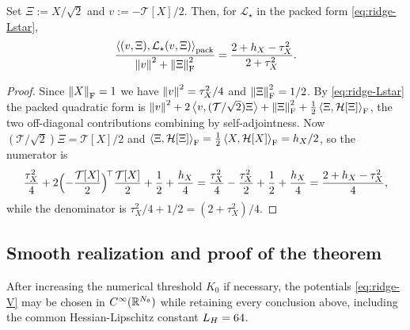 \begin{lemma}
\label{lem:ridge-Rayleigh}
Set $\Xi:=X/\sqrt2$ and $v:=-\mathcal T[X]/2$. Then, for $\mathcal L_\star$ in the packed form
\eqref{eq:ridge-Lstar},
\begin{equation}
\label{eq:ridge-Rayleigh}
    \frac{\left\langle (v,\Xi),\mathcal L_\star(v,\Xi)\right\rangle_{\mathrm{pack}}}{\left\lVert v\right\rVert^2+\left\lVert \Xi\right\rVert_{\mathrm{F}}^2}
    =\frac{2+h_X-\tau_X^2}{2+\tau_X^2}.
\end{equation}
\end{lemma}

\begin{proof}
Since $\left\lVert X\right\rVert_{\mathrm{F}}=1$ we have $\left\lVert v\right\rVert^2=\tau_X^2/4$ and $\left\lVert \Xi\right\rVert_{\mathrm{F}}^2=1/2$. By
\eqref{eq:ridge-Lstar} the packed quadratic form is
$\left\lVert v\right\rVert^2+2\left\langle v,(\mathcal T/\sqrt2)\Xi\right\rangle+\left\lVert \Xi\right\rVert_{\mathrm{F}}^2+\tfrac12\left\langle \Xi,\mathcal H[\Xi]\right\rangle_{\mathrm{F}}$,
the two off-diagonal contributions combining by self-adjointness. Now
$(\mathcal T/\sqrt2)\Xi=\mathcal T[X]/2$ and
$\left\langle \Xi,\mathcal H[\Xi]\right\rangle_{\mathrm{F}}=\tfrac12\left\langle X,\mathcal H[X]\right\rangle_{\mathrm{F}}=h_X/2$, so the
numerator is
\[
    \frac{\tau_X^2}4+2\Bigl(-\frac{\mathcal T[X]}2\Bigr)^{\!\top}\frac{\mathcal T[X]}2+\frac12+\frac{h_X}4
    =\frac{\tau_X^2}4-\frac{\tau_X^2}2+\frac12+\frac{h_X}4
    =\frac{2+h_X-\tau_X^2}4,
\]
while the denominator is $\tau_X^2/4+1/2=(2+\tau_X^2)/4$.
\end{proof}

\subsection{Smooth realization and proof of the theorem}

\begin{lemma}
\label{lem:ridge-smooth}
After increasing the numerical threshold $K_0$ if necessary, the potentials \eqref{eq:ridge-V}
may be chosen in $C^\infty(\mathbb{R}^{N_\theta})$ while retaining every conclusion above, including the
common Hessian-Lipschitz constant $L_H=64$.
\end{lemma}

